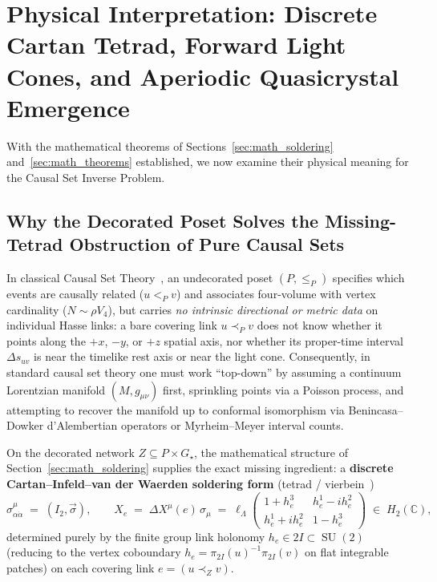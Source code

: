 \documentclass[11pt,a4paper]{article}
\theoremstyle{definition}
\theoremstyle{remark}
\newcommand{\C}{\mathbb{C}}
\newcommand{\SU}{\operatorname{SU}}
\newcommand{\Gstar}{G_\star}
\begin{document}
\section{Physical Interpretation: Discrete Cartan Tetrad, Forward Light Cones, and Aperiodic Quasicrystal Emergence}
\label{sec:physics_soldering}

With the mathematical theorems of Sections~\ref{sec:math_soldering} and~\ref{sec:math_theorems} established, we now examine their physical meaning for the Causal Set Inverse Problem.

\subsection{Why the Decorated Poset Solves the Missing-Tetrad Obstruction of Pure Causal Sets}

In classical Causal Set Theory~\cite{Bombelli1987,Myrheim1978,Surya2012}, an undecorated poset $(P, \le_P)$ specifies which events are causally related ($u <_P v$) and associates four-volume with vertex cardinality ($N \sim \rho V_4$), but carries \emph{no intrinsic directional or metric data} on individual Hasse links: a bare covering link $u \prec_P v$ does not know whether it points along the $+x$, $-y$, or $+z$ spatial axis, nor whether its proper-time interval $\Delta s_{uv}$ is near the timelike rest axis or near the light cone. Consequently, in standard causal set theory one must work ``top-down'' by assuming a continuum Lorentzian manifold $(M, g_{\mu\nu})$ first, sprinkling points via a Poisson process, and attempting to recover the manifold up to conformal isomorphism via Benincasa--Dowker d'Alembertian operators or Myrheim--Meyer interval counts.

On the decorated network $Z \subseteq P \times \Gstar$, the mathematical structure of Section~\ref{sec:math_soldering} supplies the exact missing ingredient: a \textbf{discrete Cartan--Infeld--van der Waerden soldering form} (tetrad / vierbein~\cite{InfeldVanDerWaerden1933})
\begin{equation}
\label{eq:inf_vdw}
\sigma^\mu_{\alpha\dot{\alpha}} \;=\; (I_2, \vec{\sigma}), \qquad
X_e \;=\; \Delta X^\mu(e)\,\sigma_\mu \;=\; \ell_\Lambda\begin{pmatrix} 1 + h_e^3 & h_e^1 - i h_e^2 \\ h_e^1 + i h_e^2 & 1 - h_e^3 \end{pmatrix} \;\in\; H_2(\C),
\end{equation}
determined purely by the finite group link holonomy $h_e \in 2I \subset \SU(2)$ (reducing to the vertex coboundary $h_e = \pi_{2I}(u)^{-1}\pi_{2I}(v)$ on flat integrable patches) on each covering link $e = (u \prec_Z v)$.
\end{document}
